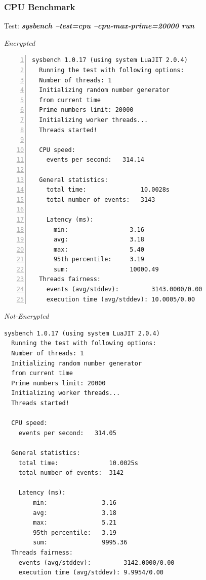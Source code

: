 \subsubsection{CPU Benchmark}
\begin{center}
  Test: \textbf{\textit{sysbench --test=cpu --cpu-max-prime=20000 run}}  
\end{center}
\vspace*{-\baselineskip}
\noindent\begin{minipage}[t]{0.45\linewidth}
  \centering
  \textit{Encrypted}
  \begin{lstlisting}[basicstyle=\tiny,frame=single, numbers=left, label=cpu_test1]
  sysbench 1.0.17 (using system LuaJIT 2.0.4)  
  Running the test with following options:
  Number of threads: 1
  Initializing random number generator
  from current time
  Prime numbers limit: 20000
  Initializing worker threads...
  Threads started!
  
  CPU speed:
    events per second:   314.14
  
  General statistics:
    total time:               10.0028s
    total number of events:   3143
  
    Latency (ms):
      min:                 3.16
      avg:                 3.18
      max:                 5.40
      95th percentile:     3.19
      sum:                 10000.49 
  Threads fairness:
    events (avg/stddev):         3143.0000/0.00
    execution time (avg/stddev): 10.0005/0.00        
  \end{lstlisting}
\end{minipage}
\hspace{0.5cm}
\noindent\begin{minipage}[t]{0.45\linewidth}
  \centering
  \textit{Not-Encrypted}
  \begin{lstlisting}[basicstyle=\tiny,frame=single, label=cpu_test2]
  sysbench 1.0.17 (using system LuaJIT 2.0.4)
  Running the test with following options:
  Number of threads: 1
  Initializing random number generator
  from current time
  Prime numbers limit: 20000
  Initializing worker threads...
  Threads started!

  CPU speed:
    events per second:   314.05

  General statistics:
    total time:              10.0025s
    total number of events:  3142

    Latency (ms):
        min:               3.16
        avg:               3.18
        max:               5.21
        95th percentile:   3.19
        sum:               9995.36
  Threads fairness:
    events (avg/stddev):         3142.0000/0.00
    execution time (avg/stddev): 9.9954/0.00
  \end{lstlisting}
\end{minipage}

